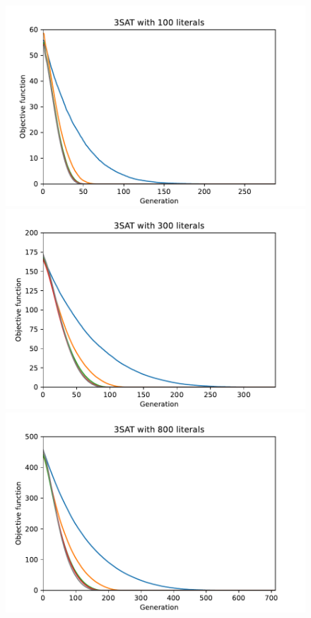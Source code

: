 \begin{figure}[ht!]
    \begin{minipage}[t]{0.32\textwidth}
        \centering
        \includegraphics[width=\textwidth]{img/runs/fitness_ga_3SAT_d100.pdf}
    \end{minipage}
    \hfill
    \begin{minipage}[t]{0.32\textwidth}
        \centering
        \includegraphics[width=\textwidth]{img/runs/fitness_ga_3SAT_d300.pdf}
    \end{minipage}
    \hfill
    \begin{minipage}[t]{0.32\textwidth}
        \centering
        \includegraphics[width=\textwidth]{img/runs/fitness_ga_3SAT_d800.pdf}
    \end{minipage}


\end{figure}
